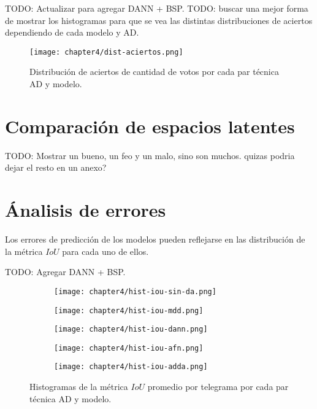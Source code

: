 TODO: Actualizar para agregar DANN + BSP. TODO: buscar una mejor forma de mostrar los histogramas para que se vea las
distintas distribuciones de aciertos dependiendo de cada modelo y AD.
\begin{figure}[H]
    \centering
    \texttt{[image: chapter4/dist-aciertos.png]}
    \caption{Distribuci\'on de aciertos de cantidad de votos por cada par t\'ecnica AD y modelo.}
    \label{fig:distribucion-aciertos}
\end{figure}

\section{Comparaci\'on de espacios latentes}

TODO: Mostrar un bueno, un feo y un malo, sino son muchos. quizas podria dejar el resto en un anexo? \lipsum[1]

\section{\'Analisis de errores}

Los errores de predicci\'on de los modelos pueden reflejarse en las distribuci\'on de la m\'etrica $IoU$ para cada uno
de ellos.

TODO: Agregar DANN + BSP.
\begin{figure}[H]
    \centering
    \begin{subfigure}[h]{0.43\textwidth}
        \texttt{[image: chapter4/hist-iou-sin-da.png]}
    \end{subfigure}
    \hfill
    \begin{subfigure}[h]{0.43\textwidth}
        \texttt{[image: chapter4/hist-iou-mdd.png]}
    \end{subfigure}
    \hfill
    \begin{subfigure}[h]{0.43\textwidth}
        \texttt{[image: chapter4/hist-iou-dann.png]}
    \end{subfigure}
    \hfill
    \begin{subfigure}[h]{0.43\textwidth}
        \texttt{[image: chapter4/hist-iou-afn.png]}
    \end{subfigure}
    \hfill
    \begin{subfigure}[h]{0.43\textwidth}
        \texttt{[image: chapter4/hist-iou-adda.png]}
    \end{subfigure}

    \caption{Histogramas de la m\'etrica $IoU$ promedio por telegrama por cada par t\'ecnica AD y modelo.}
    \label{fig:histogramas-ious}
\end{figure}

